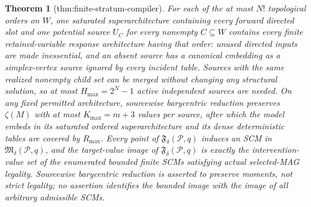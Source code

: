 \documentclass{article}
\newtheorem{theorem}{Theorem}
\begin{document}
\begin{theorem}[thm:finite-stratum-compiler]\label{thm:finite-stratum-compiler}
For each of the at most \(N!\) topological orders on \(W\), one saturated superarchitecture containing every forward directed slot and one potential source \(U_C\) for every nonempty \(C\subseteq W\) contains every finite retained-variable response architecture having that order: unused directed inputs are made inessential, and an absent source has a canonical embedding as a simplex-vertex source ignored by every incident table.  Sources with the same realized nonempty child set can be merged without changing any structural solution, so at most \(H_{\max}=2^N-1\) active independent sources are needed.  On any fixed permitted architecture, sourcewise barycentric reduction preserves \(\zeta(M)\) with at most \(K_{\max}=m+3\) values per source, after which the model embeds in its saturated ordered superarchitecture and its dense deterministic tables are covered by \(R_{\max}\).  Every point of \(\mathfrak F_\delta(\mathcal P,q)\) induces an SCM in \(\mathfrak M_\delta(\mathcal P,q)\), and the target-value image of \(\mathfrak F_\delta(\mathcal P,q)\) is exactly the intervention-value set of the enumerated bounded finite SCMs satisfying actual selected-MAG legality.  Sourcewise barycentric reduction is asserted to preserve moments, not strict legality; no assertion identifies the bounded image with the image of all arbitrary admissible SCMs.
\end{theorem}
\end{document}
